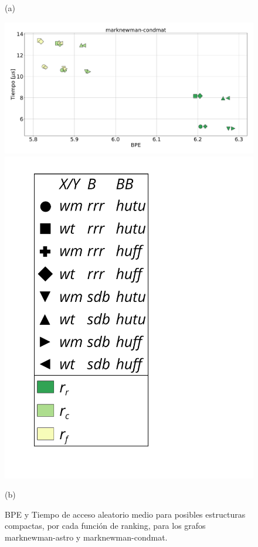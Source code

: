 \begin{figure}
\begin{minipage}{1\textwidth}
    			(a)		
    	\end{minipage}
    	
       	\begin{minipage}{1\textwidth}
    			\centering
    			\begin{minipage}{0.8\textwidth}
    				\centering
    				\includegraphics[width=1\linewidth]{img/sdsl/aleatorioBig/marknewman-condmat.pdf}
    			\end{minipage}
    			\begin{minipage}{0.15\textwidth}
    				\centering
    				\includegraphics[scale=.235, clip, trim=70 0 0 0]{img/sdsl/label.pdf}
    			\end{minipage}
    			
    			(b)		
    	\end{minipage}
    	
    \caption{BPE y Tiempo de acceso aleatorio medio para posibles estructuras compactas, por cada función de ranking, para los grafos marknewman-astro y marknewman-condmat.}
    \label{fig:sdslBPEAle2}
\end{figure}
